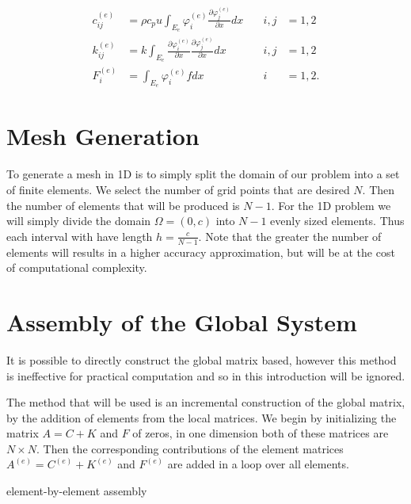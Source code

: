 \documentclass[10pt]{amsart}
\numberwithin{equation}{section}
\theoremstyle{definition}
\newcommand{\pder}[2][]{\frac{\partial#1}{\partial#2}}
\begin{document}
\begin{multicols}{2}
\begin{align*}
  c_{ij}^{(e)}&=\rho c_p u\int_{E_e}\varphi_i^{(e)}\pder[\varphi_j^{(e)}]{x}dx\quad
              &i,j&=1,2\\
  k_{ij}^{(e)}&=k\int_{E_e}\pder[\varphi_i^{(e)}]{x}\pder[\varphi_j^{(e)}]{x}dx\quad
              &i,j&=1,2\\
  F_i^{(e)}&=\int_{E_e}\varphi_i^{(e)}fdx &i&=1,2.
\end{align*}

\section{Mesh Generation}%
\label{sec:mesh_generation}

To generate a mesh in 1D is to simply split the domain of our problem into a
set of finite elements. We select the number of grid points that are desired
$N$. Then the number of elements that will be produced is $N-1$. For the 1D
problem we will simply divide the domain $\Omega=(0,c)$ into $N-1$ evenly sized
elements. Thus each interval with have length $h=\frac{c}{N-1}$. Note that the
greater the number of elements will results in a higher accuracy approximation,
but will be at the cost of computational complexity.

\section{Assembly of the Global System}%
\label{sec:assembly_of_the_global_system}

It is possible to directly construct the global matrix based, however this
method is ineffective for practical computation and so in this introduction will
be ignored.

The method that will be used is an incremental construction of the global
matrix, by the addition of elements from the local matrices. We begin by
initializing the matrix $A=C+K$ and $F$ of zeros, in one dimension both of these
matrices are $N\times N$. Then the corresponding contributions of the element
matrices $A^{(e)}=C^{(e)}+K^{(e)}$ and $F^{(e)}$ are added in a loop over all
elements.

\begin{algorithm}[H]
  \caption{element-by-element assembly}
  \begin{algorithmic}
    \EndFor
  \end{algorithmic}
\end{algorithm}


\end{multicols}
\end{document}
